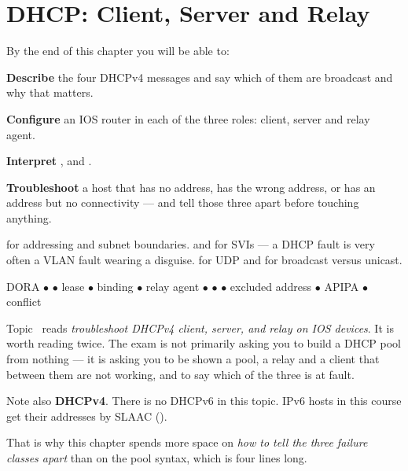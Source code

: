 \chapter{DHCP: Client, Server and Relay}\label{ch:dhcp}

\begin{outcomes}
By the end of this chapter you will be able to:
\begin{tight}
  \item \textbf{Describe} the four DHCPv4 messages and say which of them are
        broadcast and why that matters.
  \item \textbf{Configure} an IOS router in each of the three roles: client,
        server and relay agent.
  \item \textbf{Interpret} ,  and
        .
  \item \textbf{Troubleshoot} a host that has no address, has the wrong address, or
        has an address but no connectivity --- and tell those three apart before
        touching anything.
\end{tight}
\end{outcomes}

\begin{prereq}
 for addressing and subnet boundaries.  and
 for SVIs --- a DHCP fault is very often a VLAN fault wearing a
disguise.  for UDP and for broadcast versus unicast.
\end{prereq}

\begin{keyterms}
DORA $\bullet$  $\bullet$ lease $\bullet$ binding $\bullet$
relay agent $\bullet$  $\bullet$  $\bullet$
excluded address $\bullet$ APIPA $\bullet$ conflict
\end{keyterms}

\begin{examnote}
Topic~ reads \emph{troubleshoot DHCPv4 client, server, and relay on IOS
devices}. It is worth reading twice. The exam is not primarily asking you to
build a DHCP pool from nothing --- it is asking you to be shown a pool, a relay
and a client that between them are not working, and to say which of the three is
at fault.

Note also \textbf{DHCPv4}. There is no DHCPv6 in this topic. IPv6 hosts in this
course get their addresses by SLAAC ().

That is why this chapter spends more space on \emph{how to tell the three failure
classes apart} than on the pool syntax, which is four lines long.
\end{examnote}

